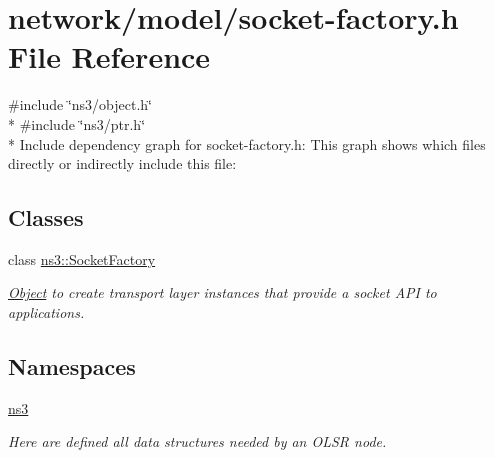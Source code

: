 \hypertarget{socket-factory_8h}{}\section{network/model/socket-\/factory.h File Reference}
\label{socket-factory_8h}
{\ttfamily \#include \char`\"{}ns3/object.\+h\char`\"{}}\\*
{\ttfamily \#include \char`\"{}ns3/ptr.\+h\char`\"{}}\\*
Include dependency graph for socket-\/factory.h\+:
This graph shows which files directly or indirectly include this file\+:
\subsection*{Classes}
\begin{DoxyCompactItemize}
\item 
class \hyperlink{classns3_1_1SocketFactory}{ns3\+::\+Socket\+Factory}
\begin{DoxyCompactList}\small\item\em \hyperlink{classns3_1_1Object}{Object} to create transport layer instances that provide a socket A\+PI to applications. \end{DoxyCompactList}\end{DoxyCompactItemize}
\subsection*{Namespaces}
\begin{DoxyCompactItemize}
\item 
 \hyperlink{namespacens3}{ns3}
\begin{DoxyCompactList}\small\item\em Here are defined all data structures needed by an O\+L\+SR node. \end{DoxyCompactList}\end{DoxyCompactItemize}
